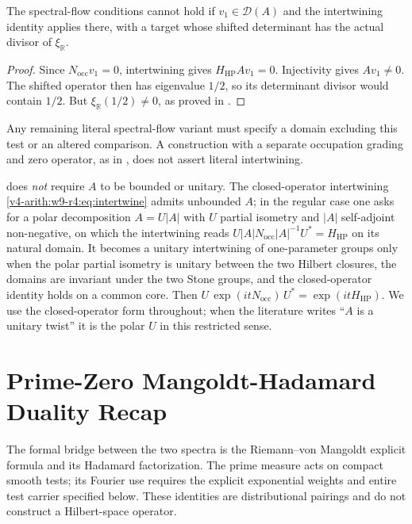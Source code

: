 \begin{proposition}
\label{v4-arith:w9-r4:vacuum-flow-obstruction}
The spectral-flow conditions cannot hold if \(v_1\in\mathcal D(A)\)
and the intertwining identity applies there, with a target whose
shifted determinant has the actual divisor of \(\xi_{\mathbb R}\).
\end{proposition}
\begin{proof}
Since \(N_{\mathrm{occ}}v_1=0\), intertwining gives
\(H_{\mathrm{HP}}Av_1=0\). Injectivity gives \(Av_1\ne0\).
The shifted operator then has eigenvalue \(1/2\), so its determinant
divisor would contain \(1/2\). But \(\xi_{\mathbb R}(1/2)\ne0\), as
proved in .
\end{proof}

Any remaining literal spectral-flow variant must specify a domain
excluding this test or an altered comparison. A construction with a
separate occupation grading and zero operator, as in
, does not assert literal intertwining.

\begin{remark}[unitarity of \(A\)]
\label{v4-arith:w9-r4:rem:unitarity-of-A}
 does \emph{not} require \(A\)
to be bounded or unitary. The closed-operator intertwining
\eqref{v4-arith:w9-r4:eq:intertwine} admits unbounded \(A\); in the
regular case one asks for a polar decomposition \(A=U|A|\) with \(U\)
partial isometry and \(|A|\) self-adjoint non-negative, on which the
intertwining reads
\(U|A|N_{\mathrm{occ}}|A|^{-1}U^{*}=H_{\mathrm{HP}}\) on its natural
domain.  It becomes a unitary intertwining of one-parameter groups only
when the polar partial isometry is unitary between the two Hilbert
closures, the domains are invariant under the two Stone groups, and the
closed-operator identity holds on a common core.  Then
\(U\,\exp(it N_{\mathrm{occ}})\,U^{*}=\exp(itH_{\mathrm{HP}})\). We use
the closed-operator form throughout; when the literature writes
``\(A\) is a unitary twist'' it is the polar \(U\) in this restricted
sense.
\end{remark}

\section{Prime-Zero Mangoldt-Hadamard Duality Recap}
\label{v4-arith:w9-r4:mangoldt-hadamard}

The formal bridge between the two spectra is the Riemann--von Mangoldt
explicit formula and its Hadamard factorization. The prime measure acts on compact smooth
tests; its Fourier use requires the explicit exponential weights
and entire test carrier specified below. These identities are
distributional pairings and do not construct a Hilbert-space operator.

